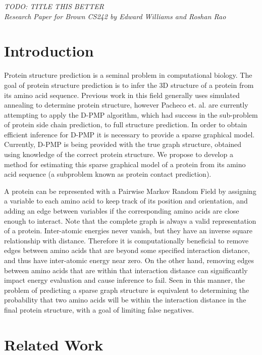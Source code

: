 \documentclass{article}
\begin{document}
\begin{center}
\emph{TODO: TITLE THIS BETTER \\ Research Paper for Brown CS242 by Edward Williams and Roshan Rao}
\end{center}

\section{Introduction}
\vspace*{-0.1in}
Protein structure prediction is a seminal problem in computational biology. The goal of protein structure prediction is to infer the 3D structure of a protein from its amino acid sequence. Previous work in this field generally uses simulated annealing to determine protein structure, however Pacheco et. al. are currently attempting to apply the D-PMP algorithm, which had success in the sub-problem of protein side chain prediction, to full structure prediction. In order to obtain efficient inference for D-PMP it is necessary to provide a sparse graphical model. Currently, D-PMP is being provided with the true graph structure, obtained using knowledge of the correct protein structure. We propose to develop a method for estimating this sparse graphical model of a protein from its amino acid sequence (a subproblem known as protein contact prediction).

A protein can be represented with a Pairwise Markov Random Field by assigning a variable to each amino acid to keep track of its position and orientation, and adding an edge between variables if the corresponding amino acids are close enough to interact. Note that the complete graph is always a valid representation of a protein. Inter-atomic energies never vanish, but they have an inverse square relationship with distance. Therefore it is computationally beneficial to remove edges between amino acids that are beyond some specified interaction distance, and thus have inter-atomic energy near zero. On the other hand, removing edges between amino acids that are within that interaction distance can significantly impact energy evaluation and cause inference to fail. Seen in this manner, the problem of predicting a sparse graph structure is equivalent to determining the probability that two amino acids will be within the interaction distance in the final protein structure, with a goal of limiting false negatives.
\vspace*{-0.1in}
\section{Related Work}
\end{document}
